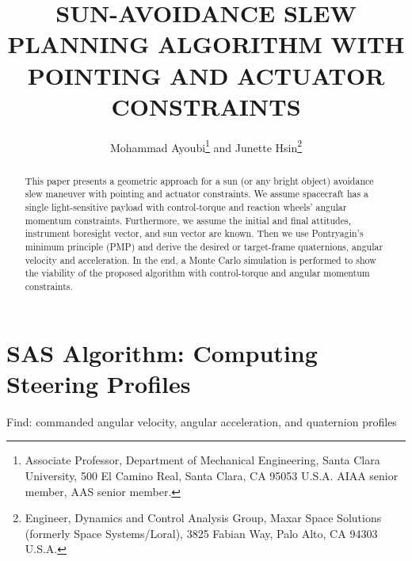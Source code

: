 \documentclass[letterpaper, preprint, paper,11pt]{AAS}	%
\begin{document}
	
	\title{SUN-AVOIDANCE SLEW PLANNING ALGORITHM WITH POINTING AND ACTUATOR CONSTRAINTS}
	
	\author{
		Mohammad Ayoubi\thanks{Associate Professor, Department of Mechanical Engineering, Santa Clara University, 500 El Camino Real, Santa Clara, CA 95053 U.S.A. AIAA senior member, AAS senior member.} and Junette Hsin\thanks{Engineer, Dynamics and Control Analysis Group, Maxar Space Solutions (formerly Space Systems/Loral), 3825 Fabian Way, Palo Alto, CA 94303 U.S.A.}
	}
	
	
	\maketitle{} 		
	
	
	\begin{abstract}
		
		This paper presents a geometric approach for a sun (or any bright object) avoidance slew maneuver with pointing and actuator constraints. We assume spacecraft has a single light-sensitive payload with control-torque and reaction wheels' angular momentum constraints. Furthermore, we assume the initial and final attitudes, instrument boresight vector, and sun vector are known. Then we use Pontryagin's minimum principle (PMP) and derive the desired or target-frame quaternions, angular velocity and acceleration. In the end, a Monte Carlo simulation is performed to show the viability of the proposed algorithm with control-torque and angular momentum constraints. 
	\end{abstract}


	\section{SAS Algorithm: Computing Steering Profiles}
	
	Find: commanded angular velocity, angular acceleration, and quaternion profiles 
			
\end{document}
